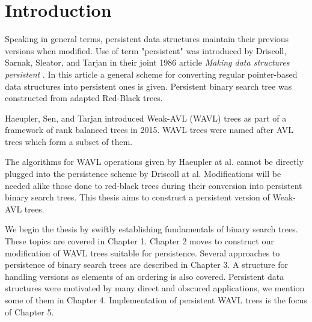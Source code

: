 \chapter*{Introduction}

Speaking in general terms, persistent data structures maintain their previous versions when modified. Use of term "persistent" was introduced by Driscoll, Sarnak, Sleator, and Tarjan in their joint 1986 article \emph{Making data structures persistent} \cite{persistence-DSST}. In this article a general scheme for converting regular pointer-based data structures into persistent ones is given. Persistent binary search tree was constructed from adapted Red-Black trees.

Haeupler, Sen, and Tarjan \cite{weight-balanced} introduced Weak-AVL (WAVL) trees as part of a framework of rank balanced trees in 2015. WAVL trees were named after AVL trees which form a subset of them.

The algorithms for WAVL operations given by Haeupler at al. cannot be directly plugged into the persistence scheme by Driscoll at al. Modifications will be needed alike those done to red-black trees during their conversion into persistent binary search trees. This thesis aims to construct a persistent version of Weak-AVL trees.

We begin the thesis by swiftly establishing fundamentals of binary search trees. These topics are covered in Chapter 1. Chapter 2 moves to construct our modification of WAVL trees suitable for persistence. Several approaches to persistence of binary search trees are described in Chapter 3. A structure for handling versions as elements of an ordering is also covered. Persistent data structures were motivated by many direct and obscured applications, we mention some of them in Chapter 4. Implementation of persistent WAVL trees is the focus of Chapter 5.

